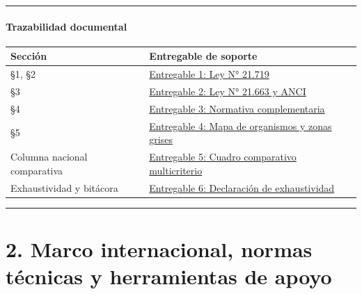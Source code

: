 \begin{center}\rule{0.5\linewidth}{0.5pt}\end{center}

\paragraph{Trazabilidad documental}\label{trazabilidad-documental}

{\def\LTcaptype{none} %
\begin{longtable}[]{@{}
  >{\raggedright\arraybackslash}p{}
  >{\raggedright\arraybackslash}p{}@{}}
\toprule\noalign{}
\begin{minipage}[b]{\linewidth}\raggedright
Sección
\end{minipage} & \begin{minipage}[b]{\linewidth}\raggedright
Entregable de soporte
\end{minipage} \\
\midrule\noalign{}
\endhead
\bottomrule\noalign{}
\endlastfoot
§1, §2 & \href{Entregables/Entregable_1_Ley_21719_Datos_Personales.md}{Entregable 1: Ley N° 21.719} \\
§3 & \href{Entregables/Entregable_2_Ley_21663_Ciberseguridad_ANCI.md}{Entregable 2: Ley N° 21.663 y ANCI} \\
§4 & \href{Entregables/Entregable_3_Normativa_Complementaria.md}{Entregable 3: Normativa complementaria} \\
§5 & \href{Entregables/Entregable_4_Mapa_Organismos_Zonas_Grises.md}{Entregable 4: Mapa de organismos y zonas grises} \\
Columna nacional comparativa & \href{Entregables/Entregable_5_Cuadro_Comparativo_Columna_Nacional.md}{Entregable 5: Cuadro comparativo multicriterio} \\
Exhaustividad y bitácora & \href{Entregables/Entregable_6_Declaracion_Exhaustividad_Bitacora.md}{Entregable 6: Declaración de exhaustividad} \\
\end{longtable}
}

\begin{center}\rule{0.5\linewidth}{0.5pt}\end{center}

\section{2. Marco internacional, normas técnicas y herramientas de apoyo}\label{marco-internacional-normas-tuxe9cnicas-y-herramientas-de-apoyo}

